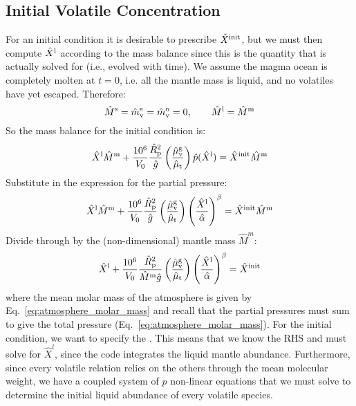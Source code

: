 \subsection{Initial Volatile Concentration}
For an initial condition it is desirable to prescribe $\hat{X}^{\rm init}$, but we must then compute $\hat{X}^{\rm l}$ according to the mass balance since this is the quantity that is actually solved for (i.e., evolved with time).  We assume the magma ocean is completely molten at $t=0$, i.e. all the mantle mass is liquid, and no volatiles have yet escaped.  Therefore:
\begin{equation}
\hat{M}^{\rm s} = \hat{m}_{\rm v}^{\rm e} = \hat{m}_{\rm v}^{\rm o} = 0, \qquad \hat{M}^{\rm l} = \hat{M}^{\rm m}
\end{equation}
So the mass balance for the initial condition is:
\begin{equation}
\hat{X}^{\rm l} \hat{M}^{\rm m} + \frac{10^6}{V_0} \frac{\hat{R}_{\rm p}^2}{\hat{g}} \left( \frac{\hat{\mu}_{\rm v}^{\rm g}}{\hat{\mu}_{\rm t}} \right)\hat{p} (\hat{X}^{\rm l}) = \hat{X}^{\rm init} \hat{M}^{\rm m}
\end{equation}
Substitute in the expression for the partial pressure:
\begin{equation}
\hat{X}^{\rm l} \hat{M}^{\rm m} + \frac{10^6}{V_0} \frac{\hat{R}_{\rm p}^2}{\hat{g}} \left( \frac{\hat{\mu}_{\rm v}^{\rm g}}{\hat{\mu}_{\rm t}} \right)\left( \frac{\hat{X}^{\rm l}}{\hat{\alpha}} \right)^\beta = \hat{X}^{\rm init} \hat{M}^{\rm m}
\end{equation}
Divide through by the (non-dimensional) mantle mass $\hat{M}^m$:
\begin{equation}
\hat{X}^{\rm l} + \frac{10^6}{V_0} \frac{\hat{R}_{\rm p}^2}{\hat{M}^{\rm m} \hat{g}} \left( \frac{\hat{\mu}_{\rm v}^{\rm g}}{\hat{\mu}_{\rm t}} \right)\left( \frac{\hat{X}^{\rm l}}{\hat{\alpha}} \right)^\beta = \hat{X}^{\rm init}
\end{equation}
where the mean molar mass of the atmosphere is given by Eq.~\ref{eq:atmosphere_molar_mass} and recall that the partial pressures must sum to give the total pressure (Eq.~\ref{eq:atmosphere_molar_mass}).  For the initial condition, we want to specify the .  This means that we know the RHS and must solve for $\hat{X}^l$, since the code integrates the liquid mantle abundance.  Furthermore, since every volatile relation relies on the others through the mean molecular weight, we have a coupled system of $p$ non-linear equations that we must solve to determine the initial liquid abundance of every volatile species.
